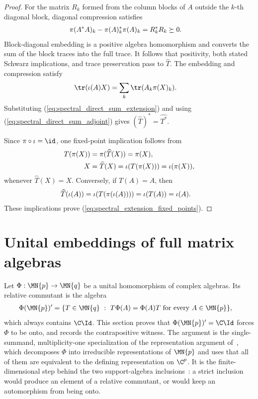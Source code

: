 \begin{proof}
    \leanok
    For the matrix $R_k$ formed from the column blocks of $A$ outside the
    $k$-th diagonal block, diagonal compression satisfies
    \begin{align}
        \pi(A^*A)_k-\pi(A)_k^*\pi(A)_k
        &=R_k^*R_k\succeq0.
        \notag
    \end{align}
    Block-diagonal embedding is a positive algebra homomorphism and converts
    the sum of the block traces into the full trace. It follows that
    positivity, both stated Schwarz implications, and trace preservation
    pass to $\widehat T$. The embedding and compression satisfy
    \begin{align}
        \tr(\iota(A)X)
        &=\sum_k\tr(A_k\pi(X)_k).
        \notag
    \end{align}
    Substituting (\ref{eq:spectral_direct_sum_extension}) and using
    (\ref{eq:spectral_direct_sum_adjoint}) gives
    $(\widehat T)^*=\widehat{T^*}$.

    Since $\pi\circ\iota=\id$, one fixed-point implication follows from
    \begin{align}
        T(\pi(X))
        &=\pi(\widehat T(X))
          =\pi(X), \notag\\
        X
        &=\widehat T(X)
          =\iota(T(\pi(X)))
          =\iota(\pi(X)),
        \notag
    \end{align}
    whenever $\widehat T(X)=X$. Conversely, if $T(A)=A$, then
    \begin{align}
        \widehat T(\iota(A))
        &=\iota(T(\pi(\iota(A))))
          =\iota(T(A))
          =\iota(A).
        \notag
    \end{align}
    These implications prove
    (\ref{eq:spectral_extension_fixed_points}).
\end{proof}

\section{Unital embeddings of full matrix algebras}

Let $\Phi:\MN{p}\to\MN{q}$ be a unital homomorphism of complex algebras. Its
relative commutant is the algebra
\begin{align}
    \Phi(\MN{p})'
    &=\{T\in\MN{q}\ :\ T\Phi(A)=\Phi(A)T\ \text{for every}\ A\in\MN{p}\},
    \label{eq:spectral_relative_commutant}
\end{align}
which always contains $\C\Id$. This section proves that
$\Phi(\MN{p})'=\C\Id$ forces $\Phi$ to be onto, and records the
contrapositive witness. The argument is the single-summand,
multiplicity-one specialization of the representation argument
of~\cite[Appendix~A]{SchumacherWerner2004}, which decomposes
$\Phi$ into irreducible representations of $\MN{p}$ and uses that all of them
are equivalent to the defining representation on $\C^p$. It is the
finite-dimensional step behind the two support-algebra
inclusions~\cite[Section~7]{GrossNesmeVogtsWerner2012}: a strict inclusion would produce
an element of a relative commutant, or would keep an automorphism from being
onto.

